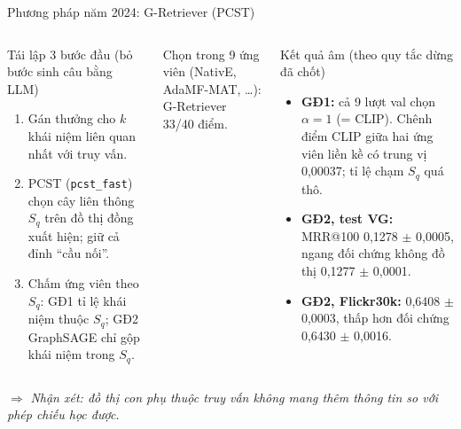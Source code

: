 \documentclass[10pt, aspectratio=169]{beamer}
\makeatletter
\newcommand{\nhanxet}[1]{\par\smallskip$\Rightarrow$ \textit{Nhận xét: #1}}
\newcommand{\code}[1]{\texttt{#1}}
\newcommand{\mrr}{MRR@100}
\newcommand{\pmm}{\ensuremath{\pm}}
\makeatother
\begin{document}
\begin{frame}{Phương pháp năm 2024: G-Retriever (PCST)}
  \begin{columns}[T]
      \begin{block}{Tái lập 3 bước đầu (bỏ bước sinh câu bằng LLM)}
        \begin{enumerate}\small
          \item Gán thưởng cho $k$ khái niệm liên quan nhất với truy vấn.
          \item PCST (\code{pcst\_fast}) chọn cây liên thông $S_q$ trên đồ thị đồng xuất hiện; giữ cả đỉnh ``cầu nối''.
          \item Chấm ứng viên theo $S_q$: GĐ1 tỉ lệ khái niệm thuộc $S_q$; GĐ2 GraphSAGE chỉ gộp khái niệm trong $S_q$.
        \end{enumerate}
      \end{block}
      {\scriptsize Chọn trong 9 ứng viên (NativE, AdaMF-MAT, \dots): G-Retriever 33/40 điểm.}
      \begin{alertblock}{Kết quả âm (theo quy tắc dừng đã chốt)}
        \begin{itemize}\small
          \item \textbf{GĐ1:} cả 9 lượt val chọn $\alpha = 1$ (= CLIP). Chênh điểm CLIP giữa hai ứng viên liền kề có trung vị 0,00037; tỉ lệ chạm $S_q$ quá thô.
          \item \textbf{GĐ2, test VG:} \mrr{} 0,1278 \pmm{} 0,0005, ngang đối chứng không đồ thị 0,1277 \pmm{} 0,0001.
          \item \textbf{GĐ2, Flickr30k:} 0,6408 \pmm{} 0,0003, thấp hơn đối chứng 0,6430 \pmm{} 0,0016.
        \end{itemize}
      \end{alertblock}
  \end{columns}
  \nhanxet{đồ thị con phụ thuộc truy vấn không mang thêm thông tin so với phép chiếu học được.}
\end{frame}
\end{document}
